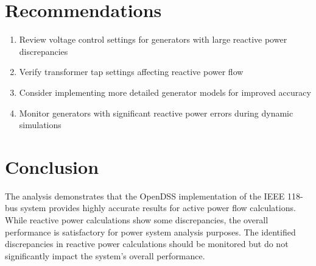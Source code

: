 \documentclass[11pt]{article}
\begin{document}
\section{Recommendations}
\begin{enumerate}
    \item Review voltage control settings for generators with large reactive power discrepancies
    \item Verify transformer tap settings affecting reactive power flow
    \item Consider implementing more detailed generator models for improved accuracy
    \item Monitor generators with significant reactive power errors during dynamic simulations
\end{enumerate}

\section{Conclusion}
The analysis demonstrates that the OpenDSS implementation of the IEEE 118-bus system provides highly accurate results for active power flow calculations. While reactive power calculations show some discrepancies, the overall performance is satisfactory for power system analysis purposes. The identified discrepancies in reactive power calculations should be monitored but do not significantly impact the system's overall performance.
\end{document}
